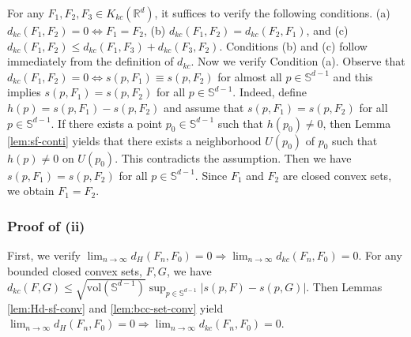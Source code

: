 \documentclass[11pt,reqno]{amsart}
\begin{document}
For any $F_1,F_2,F_3 \in K_{kc}(\mathbb{R}^d)$, it suffices to verify the following conditions. (a) $d_{kc}(F_1, F_2) = 0 \Leftrightarrow F_1 = F_2$, (b) $d_{kc}(F_1, F_2) = d_{kc}(F_2, F_1)$, and (c) $d_{kc}(F_1, F_2) \leq d_{kc}(F_1,F_3) + d_{kc}(F_3, F_2)$. Conditions (b) and (c) follow immediately from the definition of $d_{kc}$. Now we verify Condition (a). Observe that $d_{kc}(F_1, F_2) = 0 \Leftrightarrow s(p, F_1) \equiv s(p, F_2)$ for almost all $ p \in \mathbb{S}^{d-1}$ and this implies $s(p, F_1) = s(p, F_2)$ for all $p \in \mathbb{S}^{d-1}$. Indeed, define $h(p) = s(p,F_1) - s(p,F_2)$ and assume that $s(p,F_1)=s(p,F_2)$ for all $p \in \mathbb{S}^{d-1}$. If there exists a point $p_0 \in \mathbb{S}^{d-1}$ such that $h(p_0) \neq 0$, then Lemma \ref{lem:sf-conti} yields that there exists a neighborhood $U(p_0)$ of $p_0$ such that $h(p) \neq 0$ on $U(p_0)$. This contradicts the assumption. Then we have $s(p, F_1) = s(p, F_2)$ for all $p \in \mathbb{S}^{d-1}$. Since $F_1$ and $F_2$ are closed convex sets, we obtain $F_1 = F_2$. 

\subsubsection{Proof of (ii)}

First, we verify $\lim_{n \to \infty}d_H(F_n, F_0) = 0 \Rightarrow \lim_{n \to \infty}d_{kc}(F_n, F_0) = 0$. For any bounded closed convex sets, $F,G$, we have $d_{kc}(F, G) \leq \sqrt{\mathrm{vol}(\mathbb{S}^{d-1})}\sup_{p \in \mathbb{S}^{d-1}}|s(p,F) - s(p,G)|$. Then Lemmas \ref{lem:Hd-sf-conv}  and \ref{lem:bcc-set-conv} yield $\lim_{n \to \infty}d_H(F_n, F_0) = 0 \Rightarrow \lim_{n \to \infty}d_{kc}(F_n, F_0) = 0$. 
\end{document}

